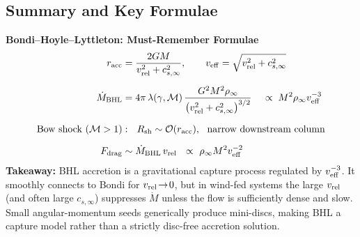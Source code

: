 \subsection*{Summary and Key Formulae}

\begin{bigidea}
\textbf{Bondi--Hoyle--Lyttleton: Must-Remember Formulae}
\begin{align*}
r_{\rm acc} &= \frac{2GM}{v_{\rm rel}^2 + c_{s,\infty}^2},
\qquad
v_{\rm eff}=\sqrt{v_{\rm rel}^2+c_{s,\infty}^2} \\[6pt]
\dot M_{\rm BHL} &= 4\pi\,\lambda(\gamma,{\cal M})\,
\frac{G^2 M^2 \rho_\infty}{\big(v_{\rm rel}^2 + c_{s,\infty}^2\big)^{3/2}}
\;\;\;\; \propto\; M^2 \rho_\infty v_{\rm eff}^{-3} \\[6pt]
\text{Bow shock (}\mathcal{M}>1\text{)}&:\ \ R_{\rm sh}\sim \mathcal{O}(r_{\rm acc}),\ \ \text{narrow downstream column} \\[6pt]
F_{\rm drag} &\sim \dot M_{\rm BHL}\,v_{\rm rel}\ \ \propto\ \rho_\infty M^2 v_{\rm eff}^{-2}
\end{align*}
\textbf{Takeaway:} BHL accretion is a gravitational capture process regulated by
$v_{\rm eff}^{-3}$. It smoothly connects to Bondi for $v_{\rm rel}\!\to\!0$, but in
wind-fed systems the large $v_{\rm rel}$ (and often large $c_{s,\infty}$) suppresses
$\dot M$ unless the flow is sufficiently dense and slow. Small angular-momentum
seeds generically produce mini-discs, making BHL a capture model rather than a
strictly disc-free accretion solution.
\end{bigidea}

